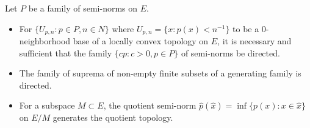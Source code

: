 Let $P$ be a family of semi-norms on $E$.
\begin{itemize}
\item[(a)] For $\{U_{p,n}: p \in P, n \in N\}$ where $U_{p,n} = \{x: p(x) < n^{-1}\}$ to be a 0-neighborhood base of a locally convex topology on $E$, it is necessary and sufficient that the family $\{cp: c > 0, p \in P\}$ of semi-norms be directed.
\item[(b)] The family of suprema of non-empty finite subsets of a generating family is directed.
\item[(c)] For a subspace $M \subset E$, the quotient semi-norm $\hat{p}(\hat{x}) = \inf \{p(x): x \in \hat{x}\}$ on $E/M$ generates the quotient topology.
\end{itemize}
